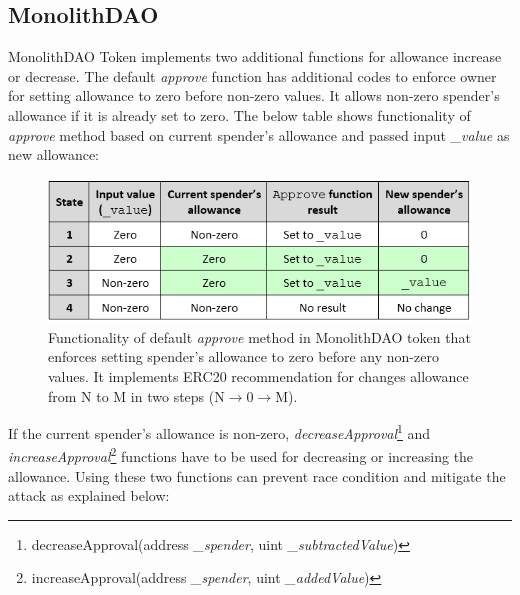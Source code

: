 \subsection{MonolithDAO}
MonolithDAO Token\cite{Ref12} implements two additional functions for allowance increase or decrease. The default \textit{approve} function has additional codes to enforce owner for setting allowance to zero before non-zero values. It allows non-zero spender's allowance if it is already set to zero. The below table shows functionality of \textit{approve} method based on current spender's allowance and passed input \textit{\_value} as new allowance:
\begin{figure}[t]
	\centering
	\includegraphics[width=1.0\linewidth]{figures/multiple_withdrawal_09.png}
	\caption{Functionality of default \textit{approve} method in MonolithDAO token that enforces setting spender's allowance to zero before any non-zero values. It implements ERC20 recommendation for changes allowance from N to M in two steps (N$\rightarrow$0$\rightarrow$M).}
\end{figure}
\noindent If the current spender’s allowance is non-zero, \textit{decreaseApproval}\footnote{decreaseApproval(address \textit{\_spender}, uint \textit{\_subtractedValue})} and \textit{increaseApproval}\footnote{increaseApproval(address \textit{\_spender}, uint \textit{\_addedValue})} functions have to be used for decreasing or increasing the allowance. Using these two functions can prevent race condition and mitigate the attack as explained below:
